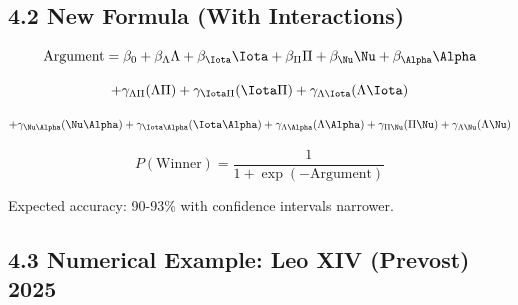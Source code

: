 \subsection{4.2 New Formula (With Interactions)}

\begin{equation}
\text{Argument} = \beta_0 + \beta_\Lambda \Lambda + \beta_\Iota \Iota + \beta_\Pi \Pi + \beta_\Nu \Nu + \beta_\Alpha \Alpha
\end{equation}

\vspace{-0.3cm}

\begin{equation}
+ \gamma_{\Lambda\Pi}(\Lambda \Pi) + \gamma_{\Iota\Pi}(\Iota \Pi) + \gamma_{\Lambda\Iota}(\Lambda \Iota)
\end{equation}

\vspace{-0.3cm}

\begin{equation}
+ \gamma_{\Nu\Alpha}(\Nu \Alpha) + \gamma_{\Iota\Alpha}(\Iota \Alpha) + \gamma_{\Lambda\Alpha}(\Lambda \Alpha) + \gamma_{\Pi\Nu}(\Pi \Nu) + \gamma_{\Lambda\Nu}(\Lambda \Nu)
\end{equation}

\vspace{-0.3cm}

\begin{equation}
P(\text{Winner}) = \frac{1}{1 + \exp(-\text{Argument})}
\end{equation}

Expected accuracy: 90-93\% with confidence intervals narrower.

\subsection{4.3 Numerical Example: Leo XIV (Prevost) 2025}

